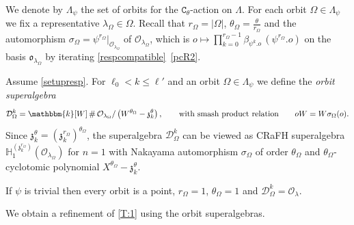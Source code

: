 \documentclass[a4paper,11pt]{amsart}
\numberwithin{equation}{subsection}
\theoremstyle{definition}
\theoremstyle{theorem}
\theoremstyle{remark}
\newcommand\CO{\mathcal{O}}
\newcommand\kapp{{\mathfrak{z}}}
\newcommand\Olam[1][\lambda]{\CO_{#1}}
\newcommand\olam[1][\lambda]{\mathfrak{o}_{#1}}
\newcommand\HH{\mathbb{H}}
\newcommand\kk{\mathbbm{k}}
\DeclareMathOperator\Smash{\#}
\begin{document}
We denote by  $\Lambda_\psi$ the set of orbits for the  $\mathtt{C}_\theta$-action on $\Lambda$.
For each  orbit $\Omega\in \Lambda_\psi$ we fix a representative $\lambda_\Omega\in\Omega$. Recall that
$r_\Omega=|\Omega|$, $\theta_\Omega=\frac{\theta}{r_\Omega}$ and the
automorphism $\sigma_\Omega=\psi^{r_\Omega}|_{\Olam[\lambda_\Omega]}$ of
$\Olam[\lambda_\Omega]$, which is $o\mapsto\prod_{k=0}^{r_\Omega-1}\beta_{\psi^{k}.o}\,(\psi^{r_\Omega}.o)$
on the basis $\olam[\lambda_\Omega]$ by iterating \autoref{respcompatible}~\autoref{pcR2}.
\begin{Definition}
Assume  \autoref{setupresp}.  For $\ell_0<k\le\ell'$ and an orbit $\Omega\in  \Lambda_\psi$ we define the \emph{orbit superalgebra}
\begin{equation}\label{E:orbitD}
  \mathcal{D}^{k}_\Omega
   =\kk[W]\Smash  \Olam [\lambda_\Omega]/\left(W^{\theta_\Omega}-\kapp_k^{\theta}\right),
   \qquad\text{with smash product relation}\qquad oW=W\sigma_\Omega(o).
\end{equation}
 Since $\kapp_k^{\theta}=(\kapp_k^{r_\Omega})^{\theta_\Omega}$, the superalgebra $\mathcal{D}^{k}_\Omega$ can be viewed as
CRaFH superalgebra $\HH^{(\kapp_k^{r_\Omega})}_1(\Olam[\lambda_\Omega])$ for $n=1$ with Nakayama
automorphism $\sigma_\Omega$ of order $\theta_\Omega$ and $\theta_\Omega$-cyclotomic polynomial $X^{\theta_\Omega}-\kapp_k^\theta$.
\end{Definition}
\begin{Remark}
 If $\psi$ is trivial
then every orbit is a point, $r_\Omega=1$, $\theta_\Omega=1$ and
$\mathcal{D}^{k}_\Omega=\Olam$.
\end{Remark}
We obtain a refinement of \autoref{T:1} using the orbit superalgebras.
\end{document}
